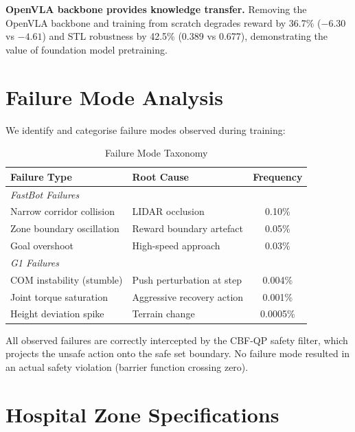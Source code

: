 \documentclass[conference]{IEEEtran}
\begin{document}
\textbf{OpenVLA backbone provides knowledge transfer.} Removing the OpenVLA backbone and training from scratch degrades reward by 36.7\% ($-6.30$ vs $-4.61$) and STL robustness by 42.5\% (0.389 vs 0.677), demonstrating the value of foundation model pretraining.

\section{Failure Mode Analysis}
\label{sec:supp_failure}

We identify and categorise failure modes observed during training:

\begin{table}[h]
\centering
\caption{Failure Mode Taxonomy}
\begin{tabular}{@{}llc@{}}
\toprule
\textbf{Failure Type} & \textbf{Root Cause} & \textbf{Frequency} \\
\midrule
\multicolumn{3}{l}{\textit{FastBot Failures}} \\
Narrow corridor collision & LIDAR occlusion & 0.10\% \\
Zone boundary oscillation & Reward boundary artefact & 0.05\% \\
Goal overshoot & High-speed approach & 0.03\% \\
\midrule
\multicolumn{3}{l}{\textit{G1 Failures}} \\
COM instability (stumble) & Push perturbation at step & 0.004\% \\
Joint torque saturation & Aggressive recovery action & 0.001\% \\
Height deviation spike & Terrain change & 0.0005\% \\
\bottomrule
\end{tabular}
\end{table}

All observed failures are correctly intercepted by the CBF-QP safety filter, which projects the unsafe action onto the safe set boundary. No failure mode resulted in an actual safety violation (barrier function crossing zero).

\section{Hospital Zone Specifications}
\label{sec:supp_zones}
\end{document}
